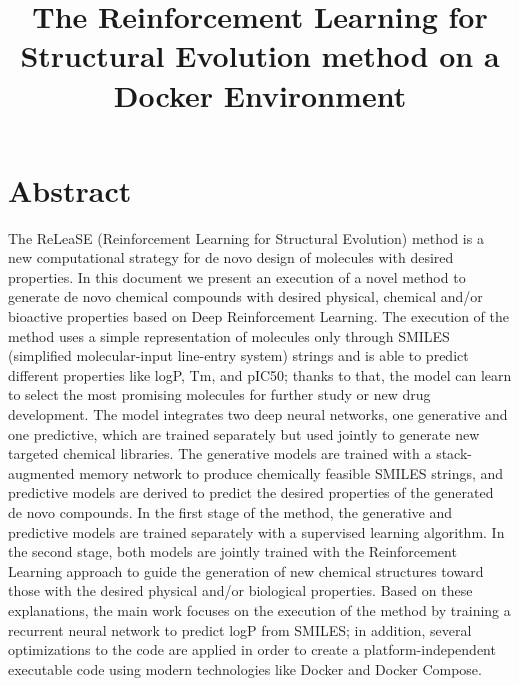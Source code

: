 \documentclass[a4paper]{article}
\begin{document}
\title{The Reinforcement Learning for Structural Evolution method on a Docker Environment}


\author{
}
\date{} %

\maketitle

\section*{Abstract}
The ReLeaSE (Reinforcement Learning for Structural Evolution) method is a new computational strategy for de novo design of molecules with desired properties.
In this document we present an execution of a novel method to generate de novo chemical compounds with desired physical, chemical and/or bioactive properties based on Deep Reinforcement Learning. The execution of the method uses a simple representation of molecules only through SMILES (simplified molecular-input line-entry system) strings and is able to predict different properties like logP, Tm, and pIC50; thanks to that, the model can learn to select the most promising molecules for further study or new drug development. 
The model integrates two deep neural networks, one generative and one predictive, which are trained separately but used jointly to generate new targeted chemical libraries. The generative models are trained with a stack-augmented memory network to produce chemically feasible SMILES strings, and predictive models are derived to predict the desired properties of the generated de novo compounds. In the first stage of the method, the generative and predictive models are trained separately with a supervised learning algorithm. In the second stage, both models are jointly trained with the Reinforcement Learning approach to guide the generation of new chemical structures toward those with the desired physical and/or biological properties.
Based on these explanations, the main work focuses on the execution of the method by training a recurrent neural network to predict logP from SMILES; in addition, several optimizations to the code are applied in order to create a platform-independent executable code using modern technologies like Docker and Docker Compose.
\end{document}
